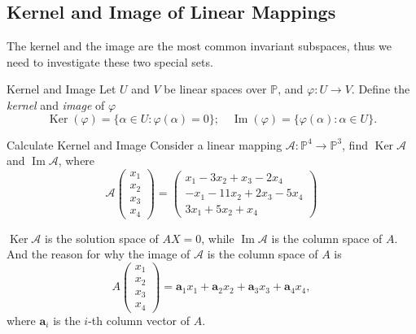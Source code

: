 \subsection{Kernel and Image of Linear Mappings}

The kernel and the image are the most common invariant subspaces,
thus we need to investigate these two special sets.

\begin{definition}{Kernel and Image}{}
  Let $U$ and $V$ be linear spaces over $\mathbb{P}$,
  and $\varphi: U \rightarrow V$.
  Define the \emph{kernel} and \emph{image} of $\varphi$
  \begin{equation}
    \operatorname{Ker} (\varphi) = \{\alpha \in U: \varphi (\alpha) = 0\}; \quad
    \operatorname{Im} (\varphi) = \{\varphi (\alpha) : \alpha \in U\}.
  \end{equation}
\end{definition}

\begin{example}{Calculate Kernel and Image}{}
  Consider a linear mapping $\mathcal{A}: \mathbb{P}^4 \rightarrow
  \mathbb{P}^3$,
  find $\operatorname{Ker} \mathcal{A}$ and $\operatorname{Im} \mathcal{A}$, where
  \begin{equation}
    \mathcal{A}\begin{pmatrix}
    x_1 \\
    x_2 \\
    x_3 \\
    x_4
    \end{pmatrix}
    =
    \begin{pmatrix}
    x_1 - 3x_2 + x_3 - 2x_4 \\
    -x_1 - 11x_2 + 2x_3 - 5x_4 \\
    3x_1 + 5x_2 + x_4
    \end{pmatrix}
  \end{equation}
\end{example}

\begin{solution}
  $\operatorname{Ker} \mathcal{A}$ is the solution space of $AX = 0$,
  while $\operatorname{Im} \mathcal{A}$ is the column space of $A$.
  And the reason for why the image of $\mathcal{A}$ is the column space of $A$ is
  \begin{equation}
    A \left(
      \begin{array}{c}
        x_1\\
        x_2\\
        x_3\\
        x_4
      \end{array}
    \right) = \mathbf{a}_1x_1 + \mathbf{a}_2x_2 + \mathbf{a}_3x_3 + \mathbf{a}_4x_4,
  \end{equation}
  where $\mathbf{a}_i$ is the $i$-th column vector of $A$.
\end{solution}

